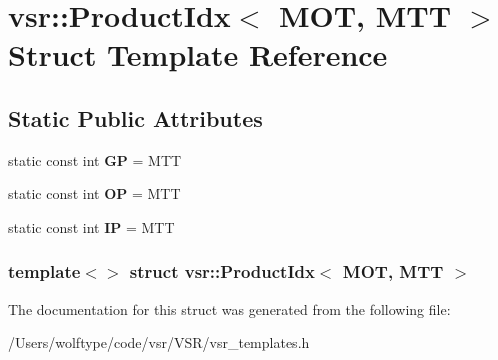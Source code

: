 \hypertarget{structvsr_1_1_product_idx_3_01_m_o_t_00_01_m_t_t_01_4}{\section{vsr\-:\-:Product\-Idx$<$ M\-O\-T, M\-T\-T $>$ Struct Template Reference}
\label{structvsr_1_1_product_idx_3_01_m_o_t_00_01_m_t_t_01_4}
}
\subsection*{Static Public Attributes}
\begin{DoxyCompactItemize}
\item 
\hypertarget{structvsr_1_1_product_idx_3_01_m_o_t_00_01_m_t_t_01_4_a270e646008c391dd0c214146c18af08f}{static const int {\bfseries G\-P} = M\-T\-T}\label{structvsr_1_1_product_idx_3_01_m_o_t_00_01_m_t_t_01_4_a270e646008c391dd0c214146c18af08f}

\item 
\hypertarget{structvsr_1_1_product_idx_3_01_m_o_t_00_01_m_t_t_01_4_aa53c2f986d061f0da34e6d2678329ec8}{static const int {\bfseries O\-P} = M\-T\-T}\label{structvsr_1_1_product_idx_3_01_m_o_t_00_01_m_t_t_01_4_aa53c2f986d061f0da34e6d2678329ec8}

\item 
\hypertarget{structvsr_1_1_product_idx_3_01_m_o_t_00_01_m_t_t_01_4_a643b30a7ac26f164fa4ce0223049b871}{static const int {\bfseries I\-P} = M\-T\-T}\label{structvsr_1_1_product_idx_3_01_m_o_t_00_01_m_t_t_01_4_a643b30a7ac26f164fa4ce0223049b871}

\end{DoxyCompactItemize}
\subsubsection*{template$<$$>$ struct vsr\-::\-Product\-Idx$<$ M\-O\-T, M\-T\-T $>$}



The documentation for this struct was generated from the following file\-:\begin{DoxyCompactItemize}
\item 
/\-Users/wolftype/code/vsr/\-V\-S\-R/vsr\-\_\-templates.\-h\end{DoxyCompactItemize}
